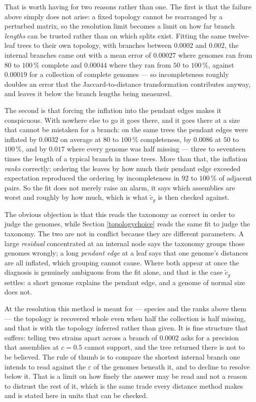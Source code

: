 \documentclass[pdflatex,sn-vancouver-num]{sn-jnl}
\begin{document}
That is worth having for two reasons rather than one. The first is that the failure above simply does
not arise: a fixed topology cannot be rearranged by a perturbed matrix, so the resolution limit
becomes a limit on how far branch \emph{lengths} can be trusted rather than on which splits exist.
Fitting the same twelve-leaf trees to their own topology, with branches between $0.0002$ and $0.002$,
the internal branches came out with a mean error of $0.00027$ where genomes ran from $80$ to
$100\,\%$ complete and $0.00044$ where they ran from $50$ to $100\,\%$, against $0.00019$ for a
collection of complete genomes --- so incompleteness roughly doubles an error that the
Jaccard-to-distance transformation contributes anyway, and leaves it below the branch lengths being
measured.

The second is that forcing the inflation into the pendant edges makes it conspicuous. With nowhere
else to go it goes there, and it goes there at a size that cannot be mistaken for a branch: on the
same trees the pendant edges were inflated by $0.0032$ on average at $80$ to $100\,\%$ completeness,
by $0.0086$ at $50$ to $100\,\%$, and by $0.017$ where every genome was half missing --- three to
seventeen times the length of a typical branch in those trees. More than that, the inflation
\emph{ranks} correctly: ordering the leaves by how much their pendant edge exceeded expectation
reproduced the ordering by incompleteness in $92$ to $100\,\%$ of adjacent pairs. So the fit does not
merely raise an alarm, it says which assemblies are worst and roughly by how much, which is what
$\tilde{c}_g$ is then checked against.

The obvious objection is that this reads the taxonomy as correct in order to judge the genomes, while
Section \ref{topologychoice} reads the same fit to judge the taxonomy. The two are not in conflict
because they are different parameters. A large \emph{residual} concentrated at an internal node says
the taxonomy groups those genomes wrongly; a long \emph{pendant edge} at a leaf says that one genome's
distances are all inflated, which grouping cannot cause. Where both appear at once the diagnosis is
genuinely ambiguous from the fit alone, and that is the case $\tilde{c}_g$ settles: a short genome
explains the pendant edge, and a genome of normal size does not.

At the resolution this method is meant for --- species and the ranks above them --- the topology is
recovered whole even when half the collection is half missing, and that is with the topology inferred
rather than given. It is fine structure that suffers:
telling two strains apart across a branch of $0.0002$ asks for a precision that assemblies at
$c = 0.5$ cannot support, and the tree returned there is not to be believed. The rule of thumb is to
compare the shortest internal branch one intends to read against the $\varepsilon$ of the genomes
beneath it, and to decline to resolve below it. That is a limit on how finely the answer may be read
and not a reason to distrust the rest of it, which is the same trade every distance method makes and
is stated here in units that can be checked.
\end{document}
